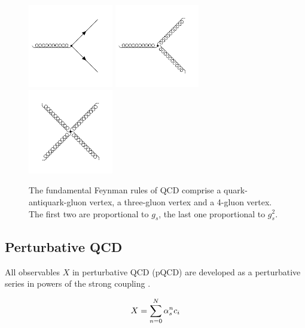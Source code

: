 \begin{figure}[htb] 
    \centering
    \includegraphics[width=0.33\textwidth]{figures/drawings/feynman/gqq.pdf}\hfill
    \includegraphics[width=0.33\textwidth]{figures/drawings/feynman/ggg.pdf}\hfill
    \includegraphics[width=0.33\textwidth]{figures/drawings/feynman/gggg.pdf}\hfill
    \caption[Fundamental vertices of QCD]{The fundamental Feynman rules of QCD
    comprise a quark-antiquark-gluon vertex, a three-gluon vertex and a 4-gluon
    vertex. The first two are proportional to $g_{s}$, the last one
    proportional to $g_{s}^2$.} 
    \label{fig:fundamental_couplings} 
\end{figure}


\subsection{Perturbative QCD}

All observables $X$ in perturbative QCD (pQCD) are developed as a
perturbative series in powers of the strong coupling \as. 

\begin{equation*}
    X = \sum_{n=0}^N \alpha_{s}^n c_i 
\end{equation*}

